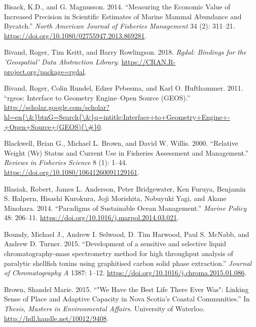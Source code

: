 \documentclass[
]{book}
\begin{document}
\leavevmode\hypertarget{ref-bisack_measuring_2014}{}%
Bisack, K.D., and G. Magnusson. 2014. ``Measuring the Economic Value of Increased Precision in Scientific Estimates of Marine Mammal Abundance and Bycatch.'' \emph{North American Journal of Fisheries Management} 34 (2): 311--21. \url{https://doi.org/10.1080/02755947.2013.869281}.

\leavevmode\hypertarget{ref-rgdal}{}%
Bivand, Roger, Tim Keitt, and Barry Rowlingson. 2018. \emph{Rgdal: Bindings for the 'Geospatial' Data Abstraction Library}. \url{https://CRAN.R-project.org/package=rgdal}.

\leavevmode\hypertarget{ref-Bivand2011}{}%
Bivand, Roger, Colin Rundel, Edzer Pebesma, and Karl O. Hufthammer. 2011. ``rgeos: Interface to Geometry Engine--Open Source (GEOS).'' \href{http://scholar.google.com/scholar?hl=en\%7B/\&\%7DbtnG=Search\%7B/\&\%7Dq=intitle:Interface+to+Geometry+Engine+-+Open+Source+(GEOS)\%7B/\#\%7D0}{http://scholar.google.com/scholar?hl=en\{\textbackslash{}\&\}btnG=Search\{\textbackslash{}\&\}q=intitle:Interface+to+Geometry+Engine+-+Open+Source+(GEOS)\{\textbackslash{}\#\}0}.

\leavevmode\hypertarget{ref-Blackwell2000}{}%
Blackwell, Brian G., Michael L. Brown, and David W. Willis. 2000. ``Relative Weight (Wr) Status and Current Use in Fisheries Assessment and Management.'' \emph{Reviews in Fisheries Science} 8 (1): 1--44. \url{https://doi.org/10.1080/10641260091129161}.

\leavevmode\hypertarget{ref-blasiak_paradigms_2014}{}%
Blasiak, Robert, James L. Anderson, Peter Bridgewater, Ken Furuya, Benjamin S. Halpern, Hisashi Kurokura, Joji Morishita, Nobuyuki Yagi, and Akane Minohara. 2014. ``Paradigms of Sustainable Ocean Management.'' \emph{Marine Policy} 48: 206--11. \url{https://doi.org/10.1016/j.marpol.2014.03.021}.

\leavevmode\hypertarget{ref-Boundy2015}{}%
Boundy, Michael J., Andrew I. Selwood, D. Tim Harwood, Paul S. McNabb, and Andrew D. Turner. 2015. ``Development of a sensitive and selective liquid chromatography-mass spectrometry method for high throughput analysis of paralytic shellfish toxins using graphitised carbon solid phase extraction.'' \emph{Journal of Chromatography A} 1387: 1--12. \url{https://doi.org/10.1016/j.chroma.2015.01.086}.

\leavevmode\hypertarget{ref-brown_we_2015}{}%
Brown, Shandel Marie. 2015. ``"We Have the Best Life There Ever Was": Linking Sense of Place and Adaptive Capacity in Nova Scotia's Coastal Communities.'' In \emph{Thesis, Masters in Environmental Affairs}. University of Waterloo. \url{http://hdl.handle.net/10012/9408}.
\end{document}
